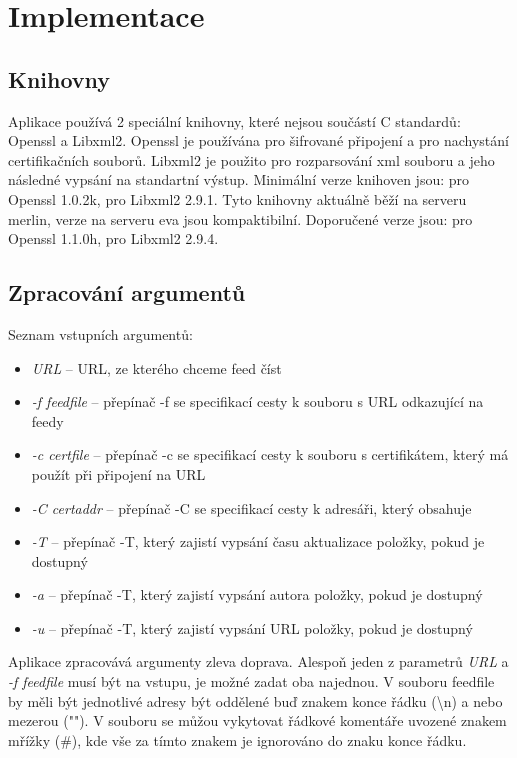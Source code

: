 \documentclass[11pt] {article}
\begin{document}
\section{Implementace}
\subsection{Knihovny}
\hspace{5mm}Aplikace používá 2 speciální knihovny, které nejsou součástí C standardů: Openssl a Libxml2. Openssl je používána pro šifrované připojení a pro nachystání certifikačních souborů. Libxml2 je použito pro rozparsování xml souboru a jeho následné vypsání na standartní výstup. Minimální verze knihoven jsou: pro Openssl 1.0.2k, pro Libxml2 2.9.1. Tyto knihovny aktuálně běží na serveru merlin, verze na serveru eva jsou kompaktibilní. Doporučené verze jsou: pro Openssl 1.1.0h, pro Libxml2 2.9.4.
\subsection{Zpracování argumentů}
Seznam vstupních argumentů:
\begin{itemize}
\item \emph{URL} -- URL, ze kterého chceme feed číst
\item \emph{-f feedfile} -- přepínač -f se specifikací cesty k souboru s URL odkazující na feedy
\item \emph{-c certfile} -- přepínač -c se specifikací cesty k souboru s certifikátem, který má použít při připojení na URL
\item \emph{-C certaddr} -- přepínač -C se specifikací cesty k adresáři, který obsahuje 
\item \emph{-T} -- přepínač -T, který zajistí vypsání času aktualizace položky, pokud je dostupný 
\item \emph{-a} -- přepínač -T, který zajistí vypsání autora položky, pokud je dostupný
\item \emph{-u} -- přepínač -T, který zajistí vypsání URL položky, pokud je dostupný  
\end{itemize}

Aplikace zpracovává argumenty zleva doprava. Alespoň jeden z parametrů \emph{URL} a \emph{-f feedfile} musí být na vstupu, je možné zadat oba najednou. V souboru feedfile by měli být jednotlivé adresy být oddělené buď znakem konce řádku (\textbackslash n) a nebo mezerou ("\hspace{2mm}"). V souboru se můžou vykytovat řádkové komentáře uvozené znakem mřížky (\#), kde vše za tímto znakem je ignorováno do znaku konce řádku.
\end{document}

